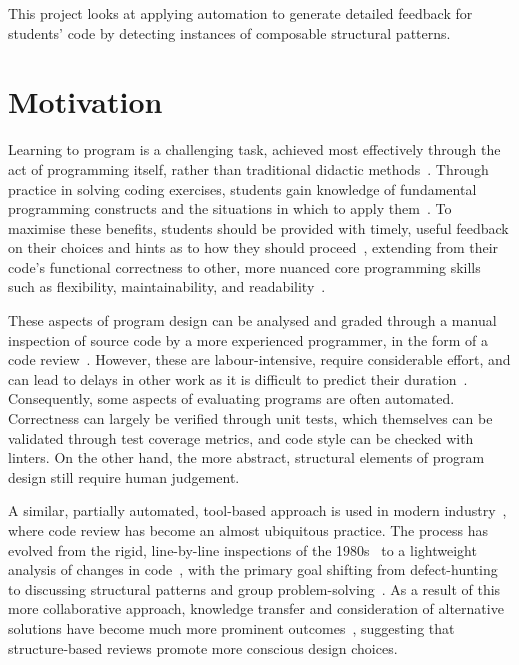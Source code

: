 
This project looks at applying automation to generate detailed feedback for students' code by detecting instances of composable structural patterns.

\section{Motivation}
\label{sec: Motivation}
Learning to program is a challenging task, achieved most effectively through the act of programming itself, rather than traditional didactic methods~\cite{DifficultyOfProgramming}. Through practice in solving coding exercises, students gain knowledge of fundamental programming constructs and the situations in which to apply them~\cite{OnTheNatureOfProgrammingExercises}. To maximise these benefits, students should be provided with timely, useful feedback on their choices and hints as to how they should proceed~\cite{TowardsGivingTimelyFormativeFeedback}, extending from their code's functional correctness to other, more nuanced core programming skills such as flexibility, maintainability, and readability~\cite{AutomatedGradingandFeedbackTools}.

These aspects of program design can be analysed and graded through a manual inspection of source code by a more experienced programmer, in the form of a code review~\cite{CodeReviewInEducation}. However, these are labour-intensive, require considerable effort, and can lead to delays in other work as it is difficult to predict their duration~\cite{WhyCannotModelCodeReviewTime}. Consequently, some aspects of evaluating programs are often automated. Correctness can largely be verified through unit tests, which themselves can be validated through test coverage metrics, and code style can be checked with linters. On the other hand, the more abstract, structural elements of program design still require human judgement.

A similar, partially automated, tool-based approach is used in modern industry~\cite{ModernCodeReview}, where code review has become an almost ubiquitous practice. The process has evolved from the rigid, line-by-line inspections of the 1980s~\cite{SoftwareInspections} to a lightweight analysis of changes in code~\cite{ModernCodeReview}, with the primary goal shifting from defect-hunting to discussing structural patterns and group problem-solving~\cite{EmpiricalCodeReview}. As a result of this more collaborative approach, knowledge transfer and consideration of alternative solutions have become much more prominent outcomes~\cite{ExpectationsOfModernCodeReview}, suggesting that structure-based reviews promote more conscious design choices.

